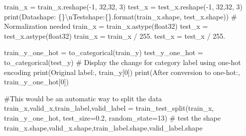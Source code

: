 \documentclass[
  letterpaper,
  DIV=11,
  numbers=noendperiod]{scrartcl}
\newenvironment{Shaded}{\begin{snugshade}}{\end{snugshade}}
\newcommand{\BuiltInTok}[1]{\textcolor[rgb]{0.00,0.23,0.31}{#1}}
\newcommand{\CharTok}[1]{\textcolor[rgb]{0.13,0.47,0.30}{#1}}
\newcommand{\CommentTok}[1]{\textcolor[rgb]{0.37,0.37,0.37}{#1}}
\newcommand{\DecValTok}[1]{\textcolor[rgb]{0.68,0.00,0.00}{#1}}
\newcommand{\FloatTok}[1]{\textcolor[rgb]{0.68,0.00,0.00}{#1}}
\newcommand{\NormalTok}[1]{\textcolor[rgb]{0.00,0.23,0.31}{#1}}
\newcommand{\OperatorTok}[1]{\textcolor[rgb]{0.37,0.37,0.37}{#1}}
\newcommand{\SpecialCharTok}[1]{\textcolor[rgb]{0.37,0.37,0.37}{#1}}
\newcommand{\StringTok}[1]{\textcolor[rgb]{0.13,0.47,0.30}{#1}}
\begin{document}
\begin{Shaded}
\begin{Highlighting}[]
\NormalTok{train\_x }\OperatorTok{=}\NormalTok{ train\_x.reshape(}\OperatorTok{{-}}\DecValTok{1}\NormalTok{, }\DecValTok{32}\NormalTok{,}\DecValTok{32}\NormalTok{, }\DecValTok{3}\NormalTok{)}
\NormalTok{test\_x }\OperatorTok{=}\NormalTok{ test\_x.reshape(}\OperatorTok{{-}}\DecValTok{1}\NormalTok{, }\DecValTok{32}\NormalTok{,}\DecValTok{32}\NormalTok{, }\DecValTok{3}\NormalTok{)}
\BuiltInTok{print}\NormalTok{(}\StringTok{\textquotesingle{}Datashape: }\SpecialCharTok{\{\}}\CharTok{\textbackslash{}n}\StringTok{Testshape:}\SpecialCharTok{\{\}}\StringTok{\textquotesingle{}}\NormalTok{.}\BuiltInTok{format}\NormalTok{(train\_x.shape, test\_x.shape))}
\CommentTok{\# Normalization needed}
\NormalTok{train\_x }\OperatorTok{=}\NormalTok{ train\_x.astype(}\StringTok{\textquotesingle{}float32\textquotesingle{}}\NormalTok{)}
\NormalTok{test\_x }\OperatorTok{=}\NormalTok{ test\_x.astype(}\StringTok{\textquotesingle{}float32\textquotesingle{}}\NormalTok{)}
\NormalTok{train\_x }\OperatorTok{=}\NormalTok{ train\_x }\OperatorTok{/} \FloatTok{255.}
\NormalTok{test\_x }\OperatorTok{=}\NormalTok{ test\_x }\OperatorTok{/} \FloatTok{255.}
\end{Highlighting}
\end{Shaded}

\begin{Shaded}
\begin{Highlighting}[]
\NormalTok{train\_y\_one\_hot }\OperatorTok{=}\NormalTok{ to\_categorical(train\_y)}
\NormalTok{test\_y\_one\_hot }\OperatorTok{=}\NormalTok{ to\_categorical(test\_y)}
\CommentTok{\# Display the change for category label using one{-}hot encoding}
\BuiltInTok{print}\NormalTok{(}\StringTok{\textquotesingle{}Original label:\textquotesingle{}}\NormalTok{, train\_y[}\DecValTok{0}\NormalTok{])}
\BuiltInTok{print}\NormalTok{(}\StringTok{\textquotesingle{}After conversion to one{-}hot:\textquotesingle{}}\NormalTok{, train\_y\_one\_hot[}\DecValTok{0}\NormalTok{])}
\end{Highlighting}
\end{Shaded}

\begin{Shaded}
\begin{Highlighting}[]
\CommentTok{\#This would be an automatic way to split the data}
\NormalTok{train\_x,valid\_x,train\_label,valid\_label }\OperatorTok{=}\NormalTok{ train\_test\_split(train\_x, train\_y\_one\_hot, test\_size}\OperatorTok{=}\FloatTok{0.2}\NormalTok{, random\_state}\OperatorTok{=}\DecValTok{13}\NormalTok{)}
\CommentTok{\# test the shape}
\NormalTok{train\_x.shape,valid\_x.shape,train\_label.shape,valid\_label.shape}
\end{Highlighting}
\end{Shaded}
\end{document}
